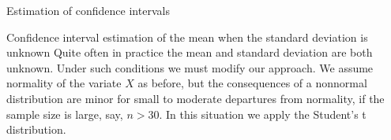 \documentclass[8pt]{beamer}
\renewcommand{\emph}[1]{\textcolor{myorange}{#1}}
\begin{document}
\begin{frame}{Estimation of confidence intervals}
    \begin{block}{Confidence interval estimation of the mean when the standard deviation is unknown}
        Quite often in practice the mean and standard deviation are both unknown. Under such conditions we must modify our approach. We assume normality of the variate $X$ as before, but the consequences of a \emph{nonnormal distribution} are minor for small to moderate departures from normality, if the sample size is large, say, $n > 30$. In this situation we apply the \emph{Student’s t distribution}.
\end{block}
\end{frame}
\end{document}
